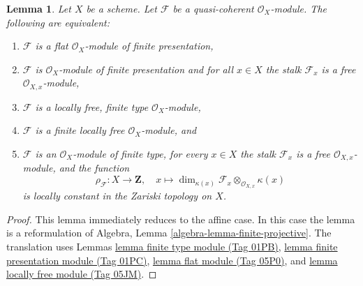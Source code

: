 \documentclass{amsart}
\theoremstyle{plain}
\newtheorem{lemma}[subsection]{Lemma}
\theoremstyle{definition}
\theoremstyle{remark}
\numberwithin{equation}{subsection}
\begin{document}
\begin{lemma}
\label{properties-lemma-finite-locally-free}
Let $X$ be a scheme.
Let $\mathcal{F}$ be a quasi-coherent $\mathcal{O}_X$-module.
The following are equivalent:
\begin{enumerate}
\item $\mathcal{F}$ is a flat $\mathcal{O}_X$-module of finite presentation,
\item $\mathcal{F}$ is $\mathcal{O}_X$-module of finite presentation and
for all $x \in X$ the stalk $\mathcal{F}_x$ is a free
$\mathcal{O}_{X, x}$-module,
\item $\mathcal{F}$ is a locally free, finite type $\mathcal{O}_X$-module,
\item $\mathcal{F}$ is a finite locally free $\mathcal{O}_X$-module, and
\item $\mathcal{F}$ is an $\mathcal{O}_X$-module of finite type,
for every $x \in X$ the stalk $\mathcal{F}_x$ is a free
$\mathcal{O}_{X, x}$-module, and the function
$$
\rho_\mathcal{F} : X \to \mathbf{Z}, \quad
x \longmapsto
\dim_{\kappa(x)} \mathcal{F}_x \otimes_{\mathcal{O}_{X, x}} \kappa(x)
$$
is locally constant in the Zariski topology on $X$.
\end{enumerate}
\end{lemma}

\begin{proof}
This lemma immediately reduces to the affine case.
In this case the lemma is a reformulation of
Algebra, Lemma \ref{algebra-lemma-finite-projective}.
The translation uses
Lemmas \href{https://stacks.math.columbia.edu/tag/01PB}{lemma finite type module (Tag 01PB)},
\href{https://stacks.math.columbia.edu/tag/01PC}{lemma finite presentation module (Tag 01PC)},
\href{https://stacks.math.columbia.edu/tag/05P0}{lemma flat module (Tag 05P0)}, and
\href{https://stacks.math.columbia.edu/tag/05JM}{lemma locally free module (Tag 05JM)}.
\end{proof}
\end{document}
